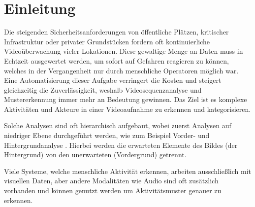 \section{Einleitung}

Die steigenden Sicherheitsanforderungen von öffentliche Plätzen, kritischer Infrastruktur oder privater Grundstücken fordern oft kontinuierliche Videoüberwachung vieler Lokationen. Diese gewaltige Menge an Daten muss in Echtzeit ausgewertet werden, um sofort auf Gefahren reagieren zu können, welches in der Vergangenheit nur durch menschliche Operatoren möglich war. Eine Automatisierung dieser Aufgabe verringert die Kosten und steigert gleichzeitig die Zuverlässigkeit, weshalb Videosequenzanalyse und Mustererkennung immer mehr an Bedeutung gewinnen. Das Ziel ist es komplexe Aktivitäten und Akteure in einer Videoaufnahme zu erkennen und kategorisieren.

Solche Analysen sind oft hierarchisch aufgebaut, wobei zuerst Analysen auf niedriger Ebene durchgeführt werden, wie zum Beispiel Vorder- und Hintergrundanalyse \cite{CSEG:Tracking}. Hierbei werden die erwarteten Elemente des Bildes (der Hintergrund) von den unerwarteten (Vordergrund) getrennt.  

Viele Systeme, welche menschliche Aktivität erkennen, arbeiten ausschließlich mit visuellen Daten, aber andere Modalitäten wie Audio sind oft zusätzlich vorhanden und können genutzt werden um Aktivitätsmuster genauer zu erkennen.